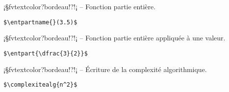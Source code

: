 \documentclass[11pt,a4paper,rgb]{report}
\begin{document}
\setlength{\leftskip}{0pt}
\setlength{\textwidth}{18cm}%


\vspace*{.75cm}

\inCodeStub¡§fvtextcolor?bordeau!?\entpartname{}!¡ -- Fonction partie entière.

\setlength{\leftskip}{.75cm}%
\setlength{\textwidth}{17.25cm}%

\colorbox{blue!15}{}
\hfill
\begin{minipage}{.65\textwidth}
	\begin{lstlisting}[linewidth=\textwidth, language={[LaTeX]TeX}]
	$\entpartname{}(3.5)$
	\end{lstlisting}
\end{minipage}

\setlength{\leftskip}{0pt}
\setlength{\textwidth}{18cm}%


\vspace*{.75cm}

\inCodeStub¡§fvtextcolor?bordeau!?\entpart{}!¡ -- Fonction partie entière appliquée à une valeur.

\setlength{\leftskip}{.75cm}%
\setlength{\textwidth}{17.25cm}%

\colorbox{blue!15}{}
\hfill
\begin{minipage}{.65\textwidth}
	\begin{lstlisting}[linewidth=\textwidth, language={[LaTeX]TeX}]
	$\entpart{\dfrac{3}{2}}$
	\end{lstlisting}
\end{minipage}

\setlength{\leftskip}{0pt}
\setlength{\textwidth}{18cm}%


\vspace*{.75cm}

\inCodeStub¡§fvtextcolor?bordeau!?!¡ -- Écriture de la complexité algorithmique.

\setlength{\leftskip}{.75cm}%
\setlength{\textwidth}{17.25cm}%

\colorbox{blue!15}{}
\hfill
\begin{minipage}{.65\textwidth}
	\begin{lstlisting}[linewidth=\textwidth, language={[LaTeX]TeX}]
	$\complexitealg{n^2}$
	\end{lstlisting}
\end{minipage}
\end{document}
